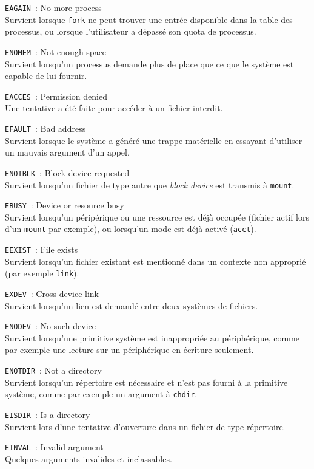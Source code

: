 \documentclass [twoside] {report}
\begin{document}
\texttt {EAGAIN}~: No more process \\
Survient lorsque \texttt {fork} ne peut trouver une
entrée disponible dans la table des processus, ou
lorsque l'utilisateur a dépassé son quota de
processus.

\texttt {ENOMEM}~: Not enough space \\
Survient lorsqu'un processus demande plus de
place que ce que le système est capable de lui
fournir.

\texttt {EACCES}~: Permission denied \\
Une tentative a été faite pour accéder à un
fichier interdit.

\texttt {EFAULT}~: Bad address \\
Survient lorsque le système a généré une trappe matérielle en
essayant d'utiliser un mauvais argument d'un
appel.

\texttt {ENOTBLK}~: Block device requested \\
Survient lorsqu'un fichier de type autre que
\textit {block device} est transmis à \texttt {mount}.

\texttt {EBUSY}~: Device or resource busy \\
Survient lorsqu'un péripérique ou une ressource
est déjà occupée (fichier actif lors d'un
\texttt {mount} par exemple), ou lorsqu'un mode est déjà
activé (\texttt {acct}).

\texttt {EEXIST}~: File exists \\
Survient lorsqu'un fichier existant est mentionné
dans un contexte non approprié (par exemple
\texttt {link}).

\texttt {EXDEV}~: Cross-device link \\
Survient lorsqu'un lien est demandé entre deux
systèmes de fichiers.

\texttt {ENODEV}~: No such device \\
Survient lorsqu'une primitive système est inappropriée
au périphérique, comme par exemple une lecture sur
un périphérique en écriture seulement.

\texttt {ENOTDIR}~: Not a directory \\
Survient lorsqu'un répertoire est nécessaire et
n'est pas fourni à la primitive système, comme par
exemple un argument à \texttt {chdir}.

\texttt {EISDIR}~: Is a directory \\
Survient lors d'une tentative d'ouverture dans un
fichier de type répertoire.

\texttt {EINVAL}~: Invalid argument \\
Quelques arguments invalides et inclassables.
\end{document}
